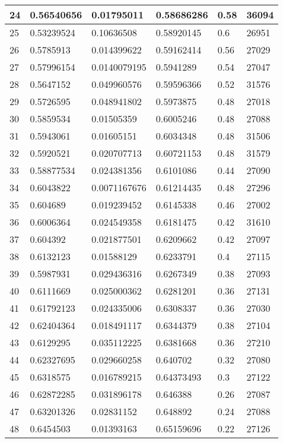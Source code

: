 \begin{longtable}{|l|l|l|l|l|l|}
24 & 0.56540656 & 0.01795011 & 0.58686286 & 0.58 & 36094 \\ \hline 
25 & 0.53239524 & 0.10636508 & 0.58920145 & 0.6 & 26951 \\ \hline 
26 & 0.5785913 & 0.014399622 & 0.59162414 & 0.56 & 27029 \\ \hline 
27 & 0.57996154 & 0.0140079195 & 0.5941289 & 0.54 & 27047 \\ \hline 
28 & 0.5647152 & 0.049960576 & 0.59596366 & 0.52 & 31576 \\ \hline 
29 & 0.5726595 & 0.048941802 & 0.5973875 & 0.48 & 27018 \\ \hline 
30 & 0.5859534 & 0.01505359 & 0.6005246 & 0.48 & 27088 \\ \hline 
31 & 0.5943061 & 0.01605151 & 0.6034348 & 0.48 & 31506 \\ \hline 
32 & 0.5920521 & 0.020707713 & 0.60721153 & 0.48 & 31579 \\ \hline 
33 & 0.58877534 & 0.024381356 & 0.6101086 & 0.44 & 27090 \\ \hline 
34 & 0.6043822 & 0.0071167676 & 0.61214435 & 0.48 & 27296 \\ \hline 
35 & 0.604689 & 0.019239452 & 0.6145338 & 0.46 & 27002 \\ \hline 
36 & 0.6006364 & 0.024549358 & 0.6181475 & 0.42 & 31610 \\ \hline 
37 & 0.604392 & 0.021877501 & 0.6209662 & 0.42 & 27097 \\ \hline 
38 & 0.6132123 & 0.01588129 & 0.6233791 & 0.4 & 27115 \\ \hline 
39 & 0.5987931 & 0.029436316 & 0.6267349 & 0.38 & 27093 \\ \hline 
40 & 0.6111669 & 0.025000362 & 0.6281201 & 0.36 & 27131 \\ \hline 
41 & 0.61792123 & 0.024335006 & 0.6308337 & 0.36 & 27030 \\ \hline 
42 & 0.62404364 & 0.018491117 & 0.6344379 & 0.38 & 27104 \\ \hline 
43 & 0.6129295 & 0.035112225 & 0.6381668 & 0.36 & 27210 \\ \hline 
44 & 0.62327695 & 0.029660258 & 0.640702 & 0.32 & 27080 \\ \hline 
45 & 0.6318575 & 0.016789215 & 0.64373493 & 0.3 & 27122 \\ \hline 
46 & 0.62872285 & 0.031896178 & 0.646388 & 0.26 & 27087 \\ \hline 
47 & 0.63201326 & 0.02831152 & 0.648892 & 0.24 & 27088 \\ \hline 
48 & 0.6454503 & 0.01393163 & 0.65159696 & 0.22 & 27126 \\ \hline 

\end{longtable}
